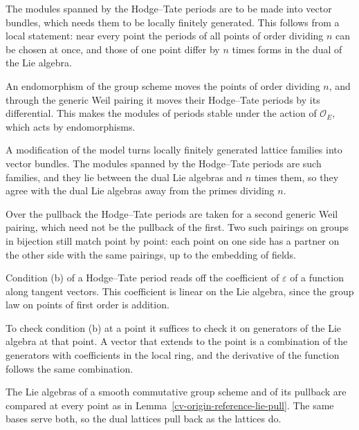 The modules spanned by the Hodge--Tate periods are to be made into vector bundles, which needs them to be locally finitely
generated. This follows from a local statement: near every point the periods of all points of order dividing $n$ can be
chosen at once, and those of one point differ by $n$ times forms in the dual of the Lie algebra.

An endomorphism of the group scheme moves the points of order dividing $n$, and through the generic Weil pairing it moves
their Hodge--Tate periods by its differential. This makes the modules of periods stable under the action of
$\mathcal O_E$, which acts by endomorphisms.

A modification of the model turns locally finitely generated lattice families into vector bundles. The modules spanned by
the Hodge--Tate periods are such families, and they lie between the dual Lie algebras and $n$ times them, so they agree
with the dual Lie algebras away from the primes dividing $n$.

Over the pullback the Hodge--Tate periods are taken for a second generic Weil pairing, which need not be the pullback of
the first. Two such pairings on groups in bijection still match point by point: each point on one side has a partner on
the other side with the same pairings, up to the embedding of fields.

Condition (b) of a Hodge--Tate period reads off the coefficient of $\varepsilon$ of a function along tangent vectors. This
coefficient is linear on the Lie algebra, since the group law on points of first order is addition.

To check condition (b) at a point it suffices to check it on generators of the Lie algebra at that point. A vector that
extends to the point is a combination of the generators with coefficients in the local ring, and the derivative of the
function follows the same combination.

The Lie algebras of a smooth commutative group scheme and of its pullback are compared at every point as in
Lemma~\ref{cv-origin-reference-lie-pull}. The same bases serve both, so the dual lattices pull back as the lattices do.

